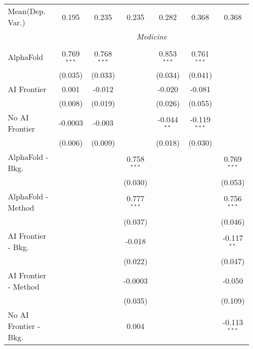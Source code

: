\begin{tabular}{lcccccc}
Mean(Dep. Var.) & 0.195 & 0.235 & 0.235 & 0.282 & 0.368 & 0.368 \\
 & \multicolumn{6}{c}{\textit{Medicine}} \\ \\
   AlphaFold               & 0.769$^{***}$ & 0.768$^{***}$ &               & 0.853$^{***}$ & 0.761$^{***}$  &   \\   
                           & (0.035)       & (0.033)       &               & (0.034)       & (0.041)        &   \\   
   AI Frontier             & 0.001         & -0.012        &               & -0.020        & -0.081         &   \\   
                           & (0.008)       & (0.019)       &               & (0.026)       & (0.055)        &   \\   
   No AI Frontier          & -0.0003       & -0.003        &               & -0.044$^{**}$ & -0.119$^{***}$ &   \\   
                           & (0.006)       & (0.009)       &               & (0.018)       & (0.030)        &   \\   
   AlphaFold - Bkg.        &               &               & 0.758$^{***}$ &               &                & 0.769$^{***}$\\   
                           &               &               & (0.030)       &               &                & (0.053)\\   
   AlphaFold - Method      &               &               & 0.777$^{***}$ &               &                & 0.756$^{***}$\\   
                           &               &               & (0.037)       &               &                & (0.046)\\   
   AI Frontier - Bkg.      &               &               & -0.018        &               &                & -0.117$^{**}$\\   
                           &               &               & (0.022)       &               &                & (0.047)\\   
   AI Frontier - Method    &               &               & -0.0003       &               &                & -0.050\\   
                           &               &               & (0.035)       &               &                & (0.109)\\   
   No AI Frontier - Bkg.   &               &               & 0.004         &               &                & -0.113$^{***}$\\   

\end{tabular}

